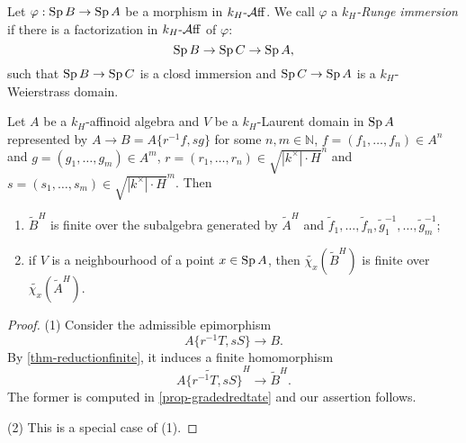 \begin{definition}
    Let $\varphi:\operatorname{Sp} B\rightarrow \operatorname{Sp} A$ be a morphism in $k_H\text{-}\mathcal{A}\mathrm{ff}$. We call $\varphi$ a \emph{$k_H$-Runge immersion} if there is a factorization in $k_H\text{-}\mathcal{A}\mathrm{ff}$ of $\varphi$:
    \[
        \operatorname{Sp} B \rightarrow \operatorname{Sp} C\rightarrow \operatorname{Sp} A,
    \]
    such that $\operatorname{Sp} B\rightarrow \operatorname{Sp} C$ is a closd immersion and $\operatorname{Sp} C\rightarrow \operatorname{Sp} A$ is a $k_H$-Weierstrass domain.
\end{definition}



\begin{lemma}\label{lma-reductionfinitegraded}
    Let $A$ be a $k_H$-affinoid algebra and $V$ be a $k_H$-Laurent domain in $\operatorname{Sp} A$ represented by $A\rightarrow B=A\{r^{-1}f,sg\}$ for some $n,m\in \mathbb{N}$, $f=(f_1,\ldots,f_n)\in A^n$ and $g=(g_1,\ldots,g_m)\in A^m$, $r=(r_1,\ldots,r_n)\in \sqrt{|k^{\times}|\cdot H}^n$ and $s=(s_1,\ldots,s_m)\in \sqrt{|k^{\times}|\cdot H}^m$. Then
    \begin{enumerate}
        \item $\tilde{B}^H$ is finite over the subalgebra generated by $\tilde{A}^H$ and $\tilde{f}_1,\ldots,\tilde{f}_n,\tilde{g}_1^{-1},\ldots,\tilde{g}_m^{-1}$;
        \item if $V$ is a neighbourhood of a point $x\in \operatorname{Sp} A$, then $\tilde{\chi_x}(\tilde{B}^H)$ is finite over $\tilde{\chi_x}(\tilde{A}^H)$.
    \end{enumerate}
\end{lemma}
\begin{proof}
    (1) Consider the admissible epimorphism 
    \[ 
        A\{r^{-1}T,s S\}\rightarrow B.
    \]
    By \cref{thm-reductionfinite}, it induces a finite homomorphism
    \[
        \widetilde{A\{r^{-1}T,s S\}}^H\rightarrow \tilde{B}^H.
    \]
    The former is computed in \cref{prop-gradedredtate} and our assertion follows.

    (2) This is a special case of (1).
\end{proof}

